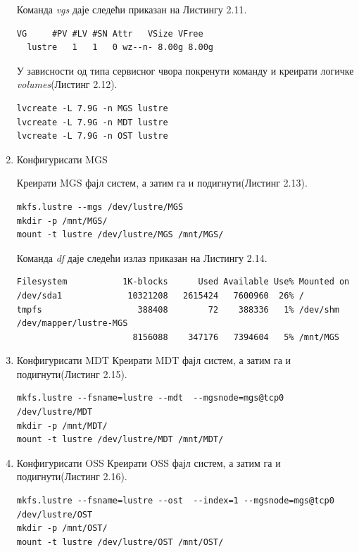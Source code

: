 \begin{enumerate}
Команда \textit{vgs} даје следећи приказан на Листингу 2.11.

\begin{lstlisting}[style=nonumbers,frame=single, caption=Излаз команде \textit{vgs}]
  VG     #PV #LV #SN Attr   VSize VFree 
  lustre   1   1   0 wz--n- 8.00g 8.00g
\end{lstlisting}

У зависности од типа сервисног чвора покренути команду и креирати логичке \textit{volumes}(Листинг 2.12).

\begin{lstlisting}[style=nonumbers,frame=single, caption=Креирање логичких \textit{volumes}]
lvcreate -L 7.9G -n MGS lustre
lvcreate -L 7.9G -n MDT lustre
lvcreate -L 7.9G -n OST lustre
\end{lstlisting}


\item Конфигурисати MGS

Креирати MGS фајл систем, а затим га и подигнути(Листинг 2.13).
\begin{lstlisting}[style=nonumbers,frame=single, caption=Креирање MGS фајл систем]
mkfs.lustre --mgs /dev/lustre/MGS
mkdir -p /mnt/MGS/
mount -t lustre /dev/lustre/MGS /mnt/MGS/ 
\end{lstlisting}


Команда  \textit{df} даје следећи излаз приказан на Листингу 2.14.
\begin{lstlisting}[style=nonumbers,frame=single, caption= Излаз \textit{df} команде]
Filesystem           1K-blocks      Used Available Use% Mounted on
/dev/sda1             10321208   2615424   7600960  26% /
tmpfs                   388408        72    388336   1% /dev/shm
/dev/mapper/lustre-MGS
                       8156088    347176   7394604   5% /mnt/MGS
\end{lstlisting}


\item Конфигурисати MDT 
Креирати MDT фајл систем, а затим га и подигнути(Листинг 2.15).

\begin{lstlisting}[style=nonumbers,frame=single, caption=Креирање MDT фајл систем]
mkfs.lustre --fsname=lustre --mdt  --mgsnode=mgs@tcp0 /dev/lustre/MDT 
mkdir -p /mnt/MDT/
mount -t lustre /dev/lustre/MDT /mnt/MDT/ 
\end{lstlisting}


\item Конфигурисати OSS 
Креирати OSS фајл систем, а затим га и подигнути(Листинг 2.16).
\begin{lstlisting}[style=nonumbers,frame=single, caption=Креирање OSS фајл систем]
mkfs.lustre --fsname=lustre --ost  --index=1 --mgsnode=mgs@tcp0 /dev/lustre/OST 
mkdir -p /mnt/OST/
mount -t lustre /dev/lustre/OST /mnt/OST/ 
\end{lstlisting}



\end{enumerate}
